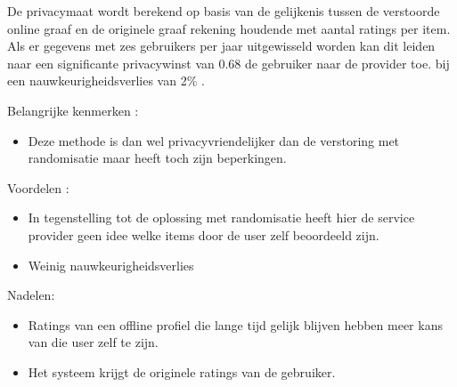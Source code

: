 De privacymaat wordt berekend op basis van de gelijkenis tussen de verstoorde online graaf en de originele graaf rekening houdende met aantal ratings per item. 
Als er gegevens met zes gebruikers per jaar uitgewisseld worden kan dit leiden naar een significante privacywinst van 0.68 de gebruiker naar de provider toe. bij een nauwkeurigheidsverlies van 2\% . 


Belangrijke kenmerken :
\begin{itemize}
 
\item Deze methode is dan wel privacyvriendelijker dan de verstoring met randomisatie maar heeft toch zijn beperkingen.
\end{itemize}
Voordelen : 
\begin{itemize}
\item In tegenstelling tot de oplossing met randomisatie heeft hier de service provider geen idee welke items door de user zelf beoordeeld zijn. 
\item Weinig nauwkeurigheidsverlies
\end{itemize}
Nadelen:
\begin{itemize}
\item Ratings van een offline profiel die lange tijd gelijk blijven hebben meer kans van die user zelf te zijn.
\item Het systeem krijgt de originele ratings van de gebruiker.

\end{itemize}

